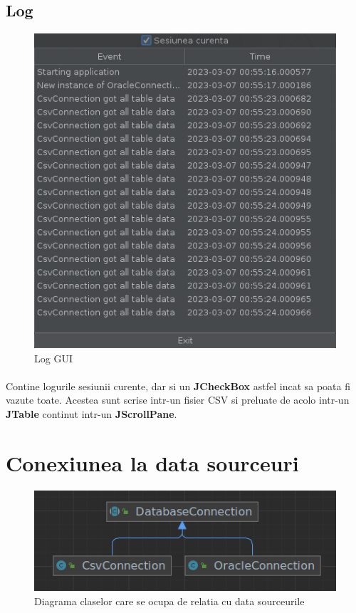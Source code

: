 \documentclass[oneside]{article}
\begin{document}
\subsection[Log]{Log}
\begin{figure}[H]
    \centering
    \noindent\includegraphics[scale=0.6]{loggui.png}
    \caption{Log GUI}
    \label{fig:loggui}
\end{figure}
\paragraph{} Contine logurile sesiunii curente, dar si un \textbf{JCheckBox} astfel incat sa poata fi vazute toate. Acestea sunt scrise intr-un fisier CSV si preluate de acolo intr-un \textbf{JTable} continut intr-un \textbf{JScrollPane}.

\section[Conexiunea la data sourceuri]{Conexiunea la data sourceuri}

\begin{figure}[ht]
    \centering
    \noindent\includegraphics[scale=0.7]{diagramadb.png}
    \caption{Diagrama claselor care se ocupa de relatia cu data sourceurile}
    \label{fig:diagramadb}
\end{figure}
\end{document}
